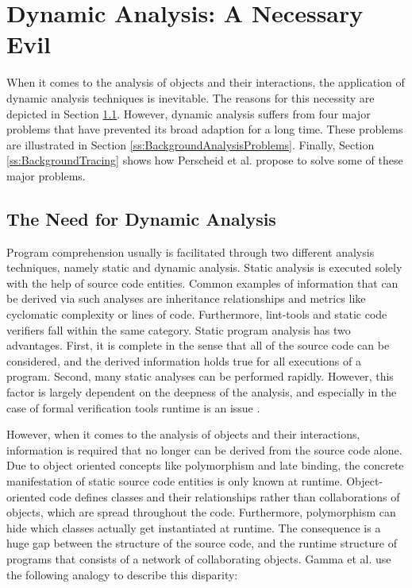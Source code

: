 \section{Dynamic Analysis: A Necessary Evil}
\label{s:BackgroundAnalysis}
When it comes to the analysis of objects and their interactions, the application of dynamic analysis techniques is inevitable.
The reasons for this necessity are depicted in Section \ref{ss:BackgroundAnalysisNeccessity}.
However, dynamic analysis suffers from four major problems that have prevented its broad adaption for a long time.
These problems are illustrated in Section \ref{ss:BackgroundAnalysisProblems}.
Finally, Section \ref{ss:BackgroundTracing} shows how Perscheid et al. propose to solve some of these major problems.

\subsection{The Need for Dynamic Analysis}
\label{ss:BackgroundAnalysisNeccessity}
Program comprehension usually is facilitated through two different analysis techniques, namely static and dynamic analysis.
Static analysis is executed solely with the help of source code entities.
Common examples of information that can be derived via such analyses are inheritance relationships and metrics like cyclomatic complexity or lines of code.
Furthermore, lint-tools and static code verifiers fall within the same category.
Static program analysis has two advantages.
First, it is complete in the sense that all of the source code can be considered, and the derived information holds true for all executions of a program.
Second, many static analyses can be performed rapidly.
However, this factor is largely dependent on the deepness of the analysis, and especially in the case of formal verification tools runtime is an issue \cite{wichmann_industrial_1995}.

However, when it comes to the analysis of objects and their interactions, information is required that no longer can be derived from the source code alone.
Due to object oriented concepts like polymorphism and late binding, the concrete manifestation of static source code entities is only known at runtime.
Object-oriented code defines classes and their relationships rather than collaborations of objects, which are spread throughout the code.
Furthermore, polymorphism can hide which classes actually get instantiated at runtime.
The consequence is a huge gap between the structure of the source code, and the runtime structure of programs that consists of a network of collaborating objects.
Gamma et al. use the following analogy to describe this disparity:

